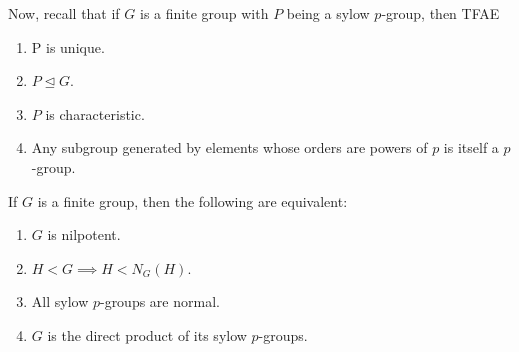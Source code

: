 Now, recall that if \(G\) is a finite group with \(P\) being a sylow \(p\)-group, then TFAE
\begin{enumerate}
	\item P is unique.
	\item \(P \trianglelefteq G\).
	\item \(P\) is characteristic.
	\item Any subgroup generated by elements whose orders are powers of \(p\) is itself a \(p\)-group.
\end{enumerate}
\begin{theorem}
	If \(G\) is a finite group, then the following are equivalent:
	\begin{enumerate}
		\item \(G\) is nilpotent.
		\item \(H < G \implies H < N_{G}\left( H \right) \).
		\item All sylow \(p\)-groups are normal.
		\item \(G\) is the direct product of its sylow \(p\)-groups.
	\end{enumerate}
\end{theorem}
